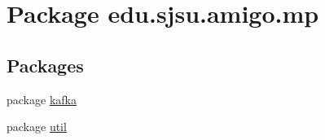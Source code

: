 \hypertarget{namespaceedu_1_1sjsu_1_1amigo_1_1mp}{}\section{Package edu.\+sjsu.\+amigo.\+mp}
\label{namespaceedu_1_1sjsu_1_1amigo_1_1mp}
\subsection*{Packages}
\begin{DoxyCompactItemize}
\item 
package \hyperlink{namespaceedu_1_1sjsu_1_1amigo_1_1mp_1_1kafka}{kafka}
\item 
package \hyperlink{namespaceedu_1_1sjsu_1_1amigo_1_1mp_1_1util}{util}
\end{DoxyCompactItemize}

